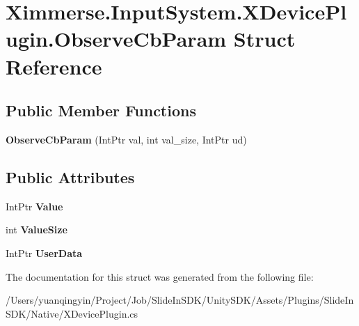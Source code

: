\hypertarget{struct_ximmerse_1_1_input_system_1_1_x_device_plugin_1_1_observe_cb_param}{}\section{Ximmerse.\+Input\+System.\+X\+Device\+Plugin.\+Observe\+Cb\+Param Struct Reference}
\label{struct_ximmerse_1_1_input_system_1_1_x_device_plugin_1_1_observe_cb_param}
\subsection*{Public Member Functions}
\begin{DoxyCompactItemize}
\item 
\mbox{\label{struct_ximmerse_1_1_input_system_1_1_x_device_plugin_1_1_observe_cb_param_a2cf17e6109e36241db50fbe054c2bd5d}} 
{\bfseries Observe\+Cb\+Param} (Int\+Ptr val, int val\+\_\+size, Int\+Ptr ud)
\end{DoxyCompactItemize}
\subsection*{Public Attributes}
\begin{DoxyCompactItemize}
\item 
\mbox{\label{struct_ximmerse_1_1_input_system_1_1_x_device_plugin_1_1_observe_cb_param_a728f15090c7884576edf9889fdb7fbe5}} 
Int\+Ptr {\bfseries Value}
\item 
\mbox{\label{struct_ximmerse_1_1_input_system_1_1_x_device_plugin_1_1_observe_cb_param_ad7c40cf28e4e1085167a701d24d45b98}} 
int {\bfseries Value\+Size}
\item 
\mbox{\label{struct_ximmerse_1_1_input_system_1_1_x_device_plugin_1_1_observe_cb_param_a25c9b84125621a1e19a245acbdc03a44}} 
Int\+Ptr {\bfseries User\+Data}
\end{DoxyCompactItemize}


The documentation for this struct was generated from the following file\+:\begin{DoxyCompactItemize}
\item 
/\+Users/yuanqingyin/\+Project/\+Job/\+Slide\+In\+S\+D\+K/\+Unity\+S\+D\+K/\+Assets/\+Plugins/\+Slide\+In\+S\+D\+K/\+Native/X\+Device\+Plugin.\+cs\end{DoxyCompactItemize}
